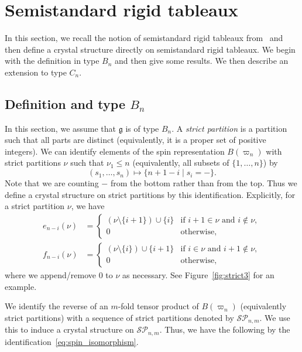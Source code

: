 \documentclass[11pt, leqno]{amsart}
\theoremstyle{plain}
\theoremstyle{definition}
\numberwithin{equation}{section}
\newcommand{\g}{\mathfrak{g}}
\newcommand{\fw}{\varpi} %
\newcommand{\defn}[1]{{\color{darkred}\emph{#1}}} %
\begin{document}
\section{Semistandard rigid tableaux}
\label{sec:rigid_tableaux}


In this section, we recall the notion of semistandard rigid tableaux from~\cite{KLO17} and then define a crystal structure directly on semistandard rigid tableaux.
We begin with the definition in type $B_n$ and then give some results. We then describe an extension to type $C_n$.

\subsection{Definition and type $B_n$}

In this section, we assume that $\g$ is of type $B_n$.
A \defn{strict partition} is a partition such that all parts are distinct (equivalently, it is a proper set of positive integers). We can identify elements of the spin representation $B(\fw_n)$ with strict partitions $\nu$ such that $\nu_1 \leq n$ (equivalently, all subsets of $\{1, \dotsc, n\}$) by
\begin{equation}
\label{eq:spin_isomorphism}
(s_1, \dotsc, s_n) \mapsto \{n+1-i \mid s_i = -\}.
\end{equation}
Note that we are counting $-$ from the bottom rather than from the top. Thus we define a crystal structure on strict partitions by this identification. Explicitly, for a strict partition $\nu$, we have
\begin{align*}
e_{n-i}(\nu) & = \begin{cases}
(\nu \setminus \{i+1\}) \cup \{i\} & \text{if $i+1 \in \nu$ and $i \notin \nu$}, \\
0 & \text{otherwise},
\end{cases}
\\ f_{n-i}(\nu) & = \begin{cases}
(\nu \setminus \{i\}) \cup \{i+1\} & \text{if $i \in \nu$ and $i+1 \notin \nu$}, \\
0 & \text{otherwise},
\end{cases}
\end{align*}
where we append/remove $0$ to $\nu$ as necessary. See Figure~\ref{fig:strict3} for an example.

We identify the reverse of an $m$-fold tensor product of $B(\fw_n)$ (equivalently strict partitions) with a sequence of strict partitions denoted by $\mathcal{SP}_{n,m}$. We use this to induce a crystal structure on $\mathcal{SP}_{n,m}$. Thus, we have the following by the identification~\eqref{eq:spin_isomorphism}.
\end{document}

